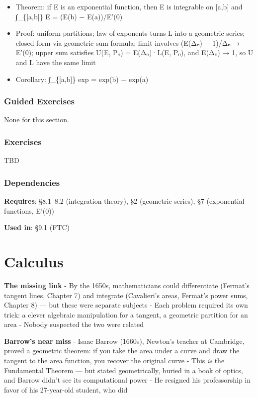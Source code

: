 \documentclass[
  10pt,
  letterpaper,
]{scrbook}
\providecommand{\tightlist}{%
  \setlength{\itemsep}{0pt}\setlength{\parskip}{0pt}}
\begin{document}
\begin{itemize}
\tightlist
\item
  Theorem: if E is an exponential function, then E is integrable on
  {[}a,b{]} and ∫\_\{{[}a,b{]}\} E = (E(b) − E(a))/E'(0)
\item
  Proof: uniform partitions; law of exponents turns L into a geometric
  series; closed form via geometric sum formula; limit involves (E(Δₙ) −
  1)/Δₙ → E'(0); upper sum satisfies U(E, Pₙ) = E(Δₙ)·L(E, Pₙ), and
  E(Δₙ) → 1, so U and L have the same limit
\item
  Corollary: ∫\_\{{[}a,b{]}\} exp = exp(b) − exp(a)
\end{itemize}

\subsection{Guided Exercises}\label{guided-exercises-18}

None for this section.

\subsection{Exercises}\label{exercises-37}

TBD

\subsection{Dependencies}\label{dependencies-37}

\textbf{Requires}: §8.1--8.2 (integration theory), §2 (geometric
series), §7 (exponential functions, E'(0))

\textbf{Used in}: §9.1 (FTC)

\chapter{Calculus}\label{calculus}

\textbf{The missing link} - By the 1650s, mathematicians could
differentiate (Fermat's tangent lines, Chapter 7) and integrate
(Cavalieri's areas, Fermat's power sums, Chapter 8) --- but these were
separate subjects - Each problem required its own trick: a clever
algebraic manipulation for a tangent, a geometric partition for an area
- Nobody suspected the two were related

\textbf{Barrow's near miss} - Isaac Barrow (1660s), Newton's teacher at
Cambridge, proved a geometric theorem: if you take the area under a
curve and draw the tangent to the area function, you recover the
original curve - This \emph{is} the Fundamental Theorem --- but stated
geometrically, buried in a book of optics, and Barrow didn't see its
computational power - He resigned his professorship in favor of his
27-year-old student, who did
\end{document}
